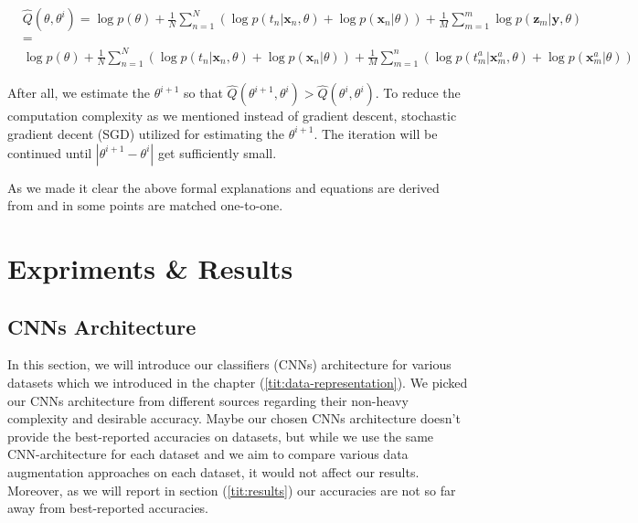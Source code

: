 \begin{equation}
  \begin{aligned}
     & \hat{Q}\left(\theta, \theta^{i}\right)=\log p(\theta)+\frac{1}{N} \sum_{n=1}^{N}\left(\log p\left(t_{n} | \mathbf{x}_{n}, \theta\right)+\log p\left(\mathbf{x}_{n} | \theta\right)\right)+\frac{1}{M} \sum_{m=1}^{m} \log p\left(\mathbf{z}_{m} | \mathbf{y}, \theta\right) \\
     & =                                                                                                                                                                                                                                                                           \\
     & \log p(\theta)+\frac{1}{N} \sum_{n=1}^{N}\left(\log p\left(t_{n} | \mathbf{x}_{n}, \theta\right)+\log p\left(\mathbf{x}_{n} | \theta\right)\right)+\frac{1}{M}
    \sum_{m=1}^{n}\left(\log p\left(t_{m}^{a} | \mathbf{x}_{m}^{a}, \theta\right)+\log p\left(\mathbf{x}_{m}^{a} | \theta\right)\right)
  \end{aligned}
\end{equation}

After all, we estimate the $\theta^{i +1}$ so that $\hat{Q}(\theta^{i +1}, \theta^{i}) >
\hat{Q}(\theta^{i}, \theta^{i})$. To reduce the computation complexity as we mentioned instead of
gradient descent, stochastic gradient decent (SGD) utilized for estimating the $\theta^{i +1}$. The
iteration will be continued until $|\theta^{i +1} - \theta^{i}|$ get sufficiently small. 

As we made it clear the above formal explanations and equations are derived from \cite{bayesian_approach} and in some points are matched one-to-one.  


\chapter{Expriments \& Results}
\section{CNNs Architecture}
In this section, we will introduce our classifiers (CNNs) architecture for various datasets which we
introduced in the chapter (\ref{tit:data-representation}). We picked our CNNs architecture from
different sources regarding their non-heavy complexity and desirable accuracy.  Maybe our chosen
CNNs architecture doesn't provide the best-reported accuracies on datasets, but while we use the
same CNN-architecture for each dataset and we aim to compare various data augmentation approaches on
each dataset, it would not affect our results. Moreover, as we will report in section (\ref{tit:results})
our accuracies are not so far away from best-reported accuracies.

